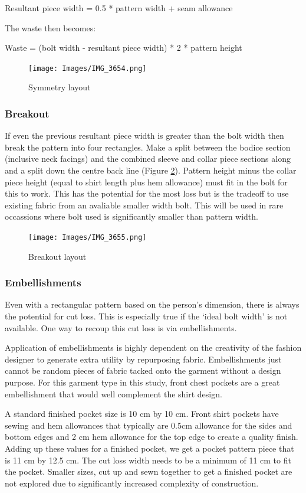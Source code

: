 Resultant piece width = 0.5 * pattern width + seam allowance

The waste then becomes:

Waste = (bolt width - resultant piece width) * 2 * pattern height
\begin{figure} [H]
    \centering
    \texttt{[image: Images/IMG\_3654.png]}
    \caption{Symmetry layout}
    \label{fig:symmetry split}
\end{figure}

\subsubsection{Breakout}
If even the previous resultant piece width is greater than the bolt width then break the pattern into four rectangles. Make a split between the bodice section (inclusive neck facings) and the combined sleeve and collar piece sections along and a split down the centre back line (Figure \ref{fig:breakout}). Pattern height minus the collar piece height (equal to shirt length plus hem allowance) must fit in the bolt for this to work. This has the potential for the most loss but is the tradeoff to use existing fabric from an avaliable smaller width bolt. This will be used in rare occassions where bolt used is significantly smaller than pattern width.
\begin{figure} [H]
    \centering
    \texttt{[image: Images/IMG\_3655.png]}
    \caption{Breakout layout}
    \label{fig:breakout}
\end{figure}


\subsubsection{Embellishments}
Even with a rectangular pattern based on the person's dimension, there is always the potential for cut loss. This is especially true if the `ideal bolt width' is not available. One way to recoup this cut loss is via embellishments.

Application of embellishments is highly dependent on the creativity of the fashion designer to generate extra utility by repurposing fabric. Embellishments just cannot be random pieces of fabric tacked onto the garment without a design purpose. For this garment type in this study, front chest pockets are a great embellishment that would well complement the shirt design. 

A standard finished pocket size is 10 cm by 10 cm. Front shirt pockets have sewing and hem allowances that typically are 0.5cm allowance for the sides and bottom edges and 2 cm hem allowance for the top edge to create a quality finish. Adding up these values for a finished pocket, we get a pocket pattern piece that is 11 cm by 12.5 cm. The cut loss width needs to be a minimum of 11 cm to fit the pocket. Smaller sizes, cut up and sewn together to get a finished pocket are not explored due to significantly increased complexity of construction.

